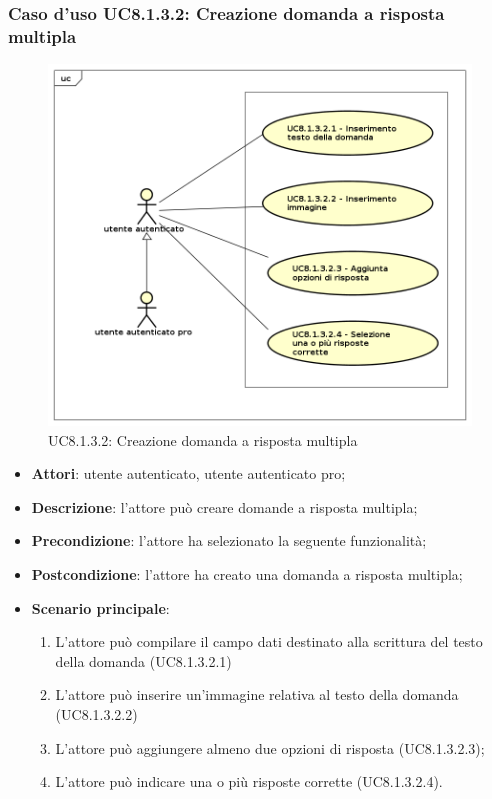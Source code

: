 \subsubsection{Caso d'uso UC8.1.3.2: Creazione domanda a risposta multipla}
	\label{UC8.1.3.2}
	\begin{figure}[h]
		\centering
			\includegraphics[scale=0.45,keepaspectratio]{UML/UC8_1_3_2.png}
		\caption{UC8.1.3.2: Creazione domanda a risposta multipla}
	\end{figure}
	\FloatBarrier
	\begin{itemize}
		\item
			\textbf{Attori}: utente autenticato, utente autenticato pro;
		\item		
			\textbf{Descrizione}: l'attore può creare domande a risposta multipla;
		\item
			\textbf{Precondizione}: l'attore ha selezionato la seguente funzionalità; 
		\item
			\textbf{Postcondizione}: l'attore ha creato una domanda a risposta multipla;
		\item
			\textbf{Scenario principale}:
	       		\begin{enumerate}
	       			\item
	       			L'attore può compilare il campo dati destinato alla scrittura del testo della domanda (UC8.1.3.2.1)
	       			\item
	       			L'attore può inserire un'immagine relativa al testo della domanda (UC8.1.3.2.2)
	       			\item
	       			L'attore può aggiungere almeno due opzioni di risposta (UC8.1.3.2.3);
					\item
					L'attore può indicare una o più risposte corrette (UC8.1.3.2.4).
	 			\end{enumerate}
	\end{itemize}

